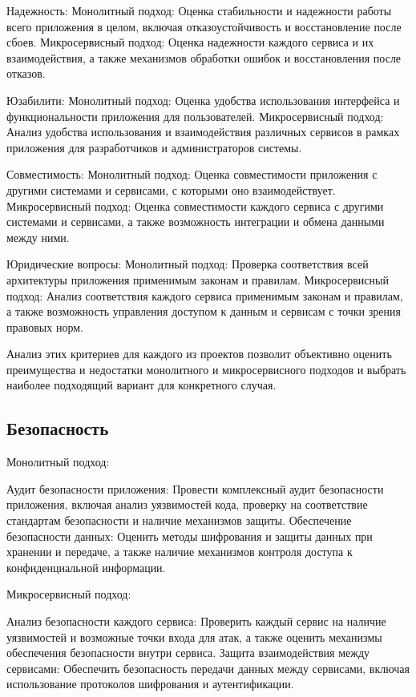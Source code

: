     Надежность:
        Монолитный подход: Оценка стабильности и надежности работы всего приложения в целом, включая отказоустойчивость и восстановление после сбоев.
        Микросервисный подход: Оценка надежности каждого сервиса и их взаимодействия, а также механизмов обработки ошибок и восстановления после отказов.

    Юзабилити:
        Монолитный подход: Оценка удобства использования интерфейса и функциональности приложения для пользователей.
        Микросервисный подход: Анализ удобства использования и взаимодействия различных сервисов в рамках приложения для разработчиков и администраторов системы.

    Совместимость:
        Монолитный подход: Оценка совместимости приложения с другими системами и сервисами, с которыми оно взаимодействует.
        Микросервисный подход: Оценка совместимости каждого сервиса с другими системами и сервисами, а также возможность интеграции и обмена данными между ними.

    Юридические вопросы:
        Монолитный подход: Проверка соответствия всей архитектуры приложения применимым законам и правилам.
        Микросервисный подход: Анализ соответствия каждого сервиса применимым законам и правилам, а также возможность управления доступом к данным и сервисам с точки зрения правовых норм.

Анализ этих критериев для каждого из проектов позволит объективно оценить преимущества и недостатки монолитного и микросервисного подходов и выбрать наиболее подходящий вариант для конкретного случая.

\subsection{Безопасность}

Монолитный подход:

    Аудит безопасности приложения: Провести комплексный аудит безопасности приложения, включая анализ уязвимостей кода, проверку на соответствие стандартам безопасности и наличие механизмов защиты.
    Обеспечение безопасности данных: Оценить методы шифрования и защиты данных при хранении и передаче, а также наличие механизмов контроля доступа к конфиденциальной информации.

Микросервисный подход:

    Анализ безопасности каждого сервиса: Проверить каждый сервис на наличие уязвимостей и возможные точки входа для атак, а также оценить механизмы обеспечения безопасности внутри сервиса.
    Защита взаимодействия между сервисами: Обеспечить безопасность передачи данных между сервисами, включая использование протоколов шифрования и аутентификации.


